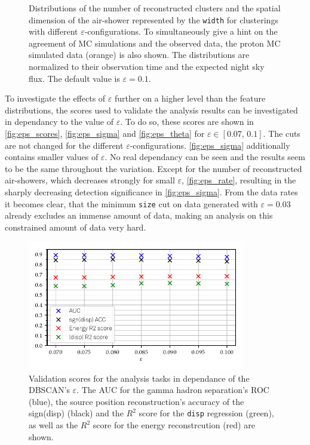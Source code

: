 \begin{figure}
\begin{subfigure}{0.5\textwidth}
  \end{subfigure}
  \caption{Distributions of the number of reconstructed
  clusters and the spatial dimension of the air-shower represented by the
  \texttt{width} for clusterings with different $\varepsilon$-configurations. To simultaneously give a hint on the agreement of MC simulations and the observed data, the proton MC simulated data (orange) is also shown. The distributions are normalized to their observation time and the expected night sky flux. The default value is $\varepsilon = 0.1$.}
  \label{fig:eps_feat3}
\end{figure}
%
To investigate the effects of $\varepsilon$ further on a higher level than the
feature distributions, the scores used to validate the analysis results can be
investigated in dependancy to the value of $\varepsilon$. To do so, these
scores are shown in \autoref{fig:eps_scores}, \ref{fig:eps_sigma} and
\ref{fig:eps_theta} for $\varepsilon \in [0.07,\,0.1]$. The cuts are not changed for the different $\varepsilon$-configurations. \autoref{fig:eps_sigma}
additionally contains smaller values of $\varepsilon$. No real dependancy can
be seen and the results seem to be the same throughout the variation. Except
for the number of reconstructed air-showers, which decreases strongly for small
$\varepsilon$, \autoref{fig:eps_rate}, resulting in the sharply decreasing
detection significance in \autoref{fig:eps_sigma}. From the data rates it becomes clear, that the minimum \texttt{size} cut on data generated with $\varepsilon=0.03$ already excludes an immense amount of data, making an analysis on this constrained amount of data very hard.
%
\begin{figure}
  \centering
  \includegraphics[width=0.85\textwidth]{Plots/Epsilon/eps_scores.pdf}
  \caption{Validation scores for the analysis tasks in dependance of the DBSCAN's $\varepsilon$. The AUC for the gamma hadron separation's ROC (blue), the source position reconstruction's accuracy of the sign(disp) (black) and the $R^2$ score for the \texttt{disp} regression (green), as well as the $R^2$ score for the energy reconstrcution (red) are shown.}
  \label{fig:eps_scores}
\end{figure}
